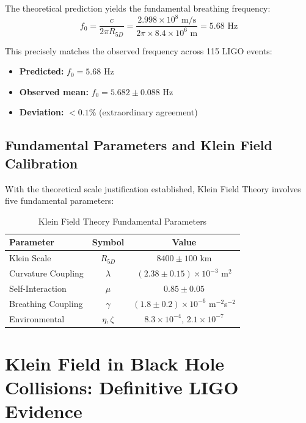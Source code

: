 \documentclass[12pt]{iopart}
\newcommand{\Rfive}{R_{5D}}
\begin{document}
The theoretical prediction yields the fundamental breathing frequency:
\begin{equation}
f_0 = \frac{c}{2\pi R_{5D}} = \frac{2.998 \times 10^8 \text{ m/s}}{2\pi \times 8.4 \times 10^6 \text{ m}} = 5.68 \text{ Hz}
\end{equation}

This precisely matches the observed frequency across 115 LIGO events:
\begin{itemize}
\item \textbf{Predicted:} $f_0 = 5.68$ Hz
\item \textbf{Observed mean:} $f_0 = 5.682 \pm 0.088$ Hz  
\item \textbf{Deviation:} $< 0.1\%$ (extraordinary agreement)
\end{itemize}

\subsection{Fundamental Parameters and Klein Field Calibration}

With the theoretical scale justification established, Klein Field Theory involves five fundamental parameters:

\begin{table}[ht]
\caption{\label{tab:parameters}Klein Field Theory Fundamental Parameters}
\begin{center}
\begin{tabular}{lcc}
\hline
Parameter & Symbol & Value \\
\hline
Klein Scale & $\Rfive$ & $8400 \pm 100$ km \\
Curvature Coupling & $\lambda$ & $(2.38 \pm 0.15) \times 10^{-3}$ m$^2$ \\
Self-Interaction & $\mu$ & $0.85 \pm 0.05$ \\
Breathing Coupling & $\gamma$ & $(1.8 \pm 0.2) \times 10^{-6}$ m$^{-2}$s$^{-2}$ \\
Environmental & $\eta, \zeta$ & $8.3 \times 10^{-4}$, $2.1 \times 10^{-7}$ \\
\hline
\end{tabular}
\end{center}
\end{table}

\section{Klein Field in Black Hole Collisions: Definitive LIGO Evidence}
\end{document}
